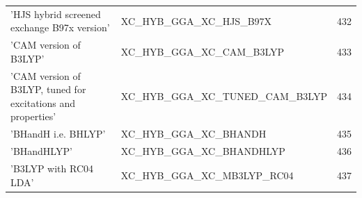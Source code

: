 \documentclass[final,12pt,makeidx,DIV=calc]{article}
\begin{document}
{{{\begin{table}[!h]
\begin{center}
\begin{tabular}{llr}
  'HJS hybrid screened exchange B97x version' & XC\_HYB\_GGA\_XC\_HJS\_B97X  &432\\
  'CAM version of B3LYP' & XC\_HYB\_GGA\_XC\_CAM\_B3LYP  &433\\
  'CAM version of B3LYP, tuned for excitations and properties' & XC\_HYB\_GGA\_XC\_TUNED\_CAM\_B3LYP  &434\\
  'BHandH i.e. BHLYP' & XC\_HYB\_GGA\_XC\_BHANDH  &435\\
  'BHandHLYP' & XC\_HYB\_GGA\_XC\_BHANDHLYP  &436\\
  'B3LYP with RC04 LDA' & XC\_HYB\_GGA\_XC\_MB3LYP\_RC04  &437\\
\end{tabular}
\end{center}
\end{table}

}}}
\end{document}
